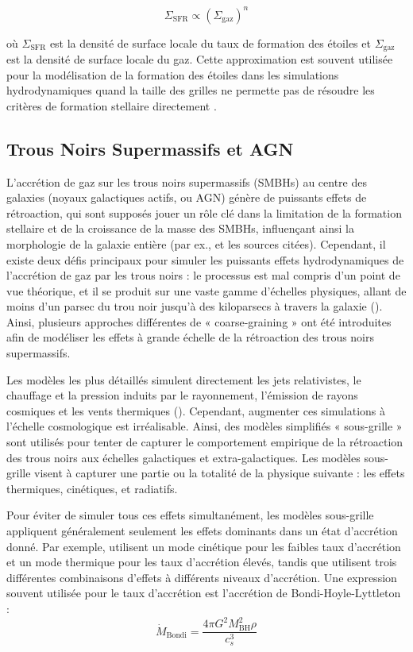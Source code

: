 \documentclass{article}
\begin{document}
\begin{equation}
    \Sigma_{\text{SFR}} \propto \left(\Sigma_{\text{gaz}} \right)^n
\end{equation}

où $\Sigma_{\text{SFR}}$ est la densité de surface locale du taux de formation des étoiles et $\Sigma_{\text{gaz}}$ est la densité de surface locale du gaz. Cette approximation est souvent utilisée pour la modélisation de la formation des étoiles dans les simulations hydrodynamiques quand la taille des grilles ne permette pas de résoudre les critères de formation stellaire directement \citep[par ex.,][]{SIMBA_SMBH}. 

\subsection{Trous Noirs Supermassifs et AGN}

L’accrétion de gaz sur les trous noirs supermassifs (SMBHs) au centre des galaxies (noyaux galactiques actifs, ou AGN) génère de puissants effets de rétroaction, qui sont supposés jouer un rôle clé dans la limitation de la formation stellaire et de la croissance de la masse des SMBHs, influençant ainsi la morphologie de la galaxie entière (par ex., \citep{FU_SMBH_STARS} et les sources citées). Cependant, il existe deux défis principaux pour simuler les puissants effets hydrodynamiques de l’accrétion de gaz par les trous noirs : le processus est mal compris d’un point de vue théorique, et il se produit sur une vaste gamme d’échelles physiques, allant de moins d’un parsec du trou noir jusqu’à des kiloparsecs à travers la galaxie (\citep{ILLUSTRIS_SMBH}). Ainsi, plusieurs approches différentes de « coarse-graining » ont été introduites afin de modéliser les effets à grande échelle de la rétroaction des trous noirs supermassifs.

Les modèles les plus détaillés simulent directement les jets relativistes, le chauffage et la pression induits par le rayonnement, l’émission de rayons cosmiques et les vents thermiques (\citep{SMBH_JETS}). Cependant, augmenter ces simulations à l’échelle cosmologique est irréalisable. Ainsi, des modèles simplifiés « sous-grille » sont utilisés pour tenter de capturer le comportement empirique de la rétroaction des trous noirs aux échelles galactiques et extra-galactiques. Les modèles sous-grille visent à capturer une partie ou la totalité de la physique suivante : les effets thermiques, cinétiques, et radiatifs.

Pour éviter de simuler tous ces effets simultanément, les modèles sous-grille appliquent généralement seulement les effets dominants dans un état d’accrétion donné. Par exemple, \citet{ILLUSTRIS_SMBH} utilisent un mode cinétique pour les faibles taux d’accrétion et un mode thermique pour les taux d’accrétion élevés, tandis que \citet{SIMBA_SMBH} utilisent trois différentes combinaisons d’effets à différents niveaux d’accrétion. Une expression souvent utilisée pour le taux d’accrétion est l’accrétion de Bondi-Hoyle-Lyttleton :
\begin{equation}
\dot M_{\text{Bondi}} = \frac{4 \pi G^2 M_{\text{BH}}^2 \rho}{c_s^3}
\end{equation}
\end{document}
